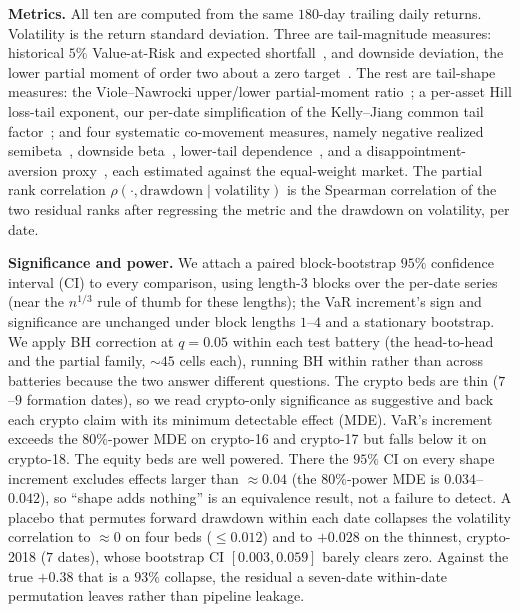 \documentclass[sigconf,anonymous,nonacm]{acmart}
\begin{document}
\textbf{Metrics.} All ten are computed from the same $180$-day trailing daily returns.
Volatility is the return standard deviation. Three are tail-magnitude measures: historical
$5\%$ Value-at-Risk and expected shortfall~\cite{rockafellar2000}, and downside deviation,
the lower partial moment of order two about a zero target~\cite{bawa1975,sortino1991}. The
rest are tail-shape measures: the Viole--Nawrocki upper/lower partial-moment
ratio~\cite{violenawrocki2016}; a per-asset Hill loss-tail exponent, our per-date
simplification of the Kelly--Jiang common tail factor~\cite{kellyjiang2014}; and four
systematic co-movement measures, namely negative realized semibeta~\cite{bpq2022}, downside
beta~\cite{ang2006}, lower-tail dependence~\cite{chabiyo2018}, and a
disappointment-aversion proxy~\cite{faragotedongap2018}, each estimated against the
equal-weight market. The partial rank correlation
$\rho(\cdot,\text{drawdown}\mid\text{volatility})$ is the Spearman correlation of the two
residual ranks after regressing the metric and the drawdown on volatility, per date.

\textbf{Significance and power.} We attach a paired block-bootstrap $95\%$ confidence
interval (CI) to every comparison, using length-$3$ blocks over the per-date series (near
the $n^{1/3}$ rule of thumb for these lengths); the VaR increment's sign and significance
are unchanged under block lengths $1$--$4$ and a stationary bootstrap. We apply BH
correction at $q=0.05$ within each test battery (the head-to-head and the partial family,
${\sim}45$ cells each), running BH within rather than across batteries because the two
answer different questions. The crypto beds are thin ($7$--$9$ formation dates), so we read
crypto-only significance as suggestive and back each crypto claim with its minimum
detectable effect (MDE). VaR's increment exceeds the $80\%$-power MDE on crypto-16 and
crypto-17 but falls below it on crypto-18. The equity beds are well powered. There the
$95\%$ CI on every shape increment excludes effects larger than $\approx0.04$ (the
$80\%$-power MDE is $0.034$--$0.042$), so ``shape adds nothing'' is an equivalence result,
not a failure to detect. A placebo that permutes forward drawdown within each date
collapses the volatility correlation to $\approx0$ on four beds (${\le}0.012$) and to
$+0.028$ on the thinnest, crypto-2018 ($7$ dates), whose bootstrap CI $[0.003,0.059]$
barely clears zero. Against the true $+0.38$ that is a $93\%$ collapse, the residual a
seven-date within-date permutation leaves rather than pipeline leakage.
\end{document}
